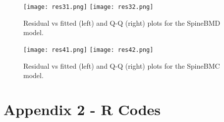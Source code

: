 \documentclass[11pt]{article}
\begin{document}
            \begin{figure}[!htbp]
            \centering
            \texttt{[image: res31.png]} \texttt{[image: res32.png]}
            \caption{Residual vs fitted (left) and Q-Q (right) plots for the SpineBMD model.}
            \label{fig:method}
            \end{figure}

            \begin{figure}[!htbp]
            \centering
            \texttt{[image: res41.png]} \texttt{[image: res42.png]}
            \caption{Residual vs fitted (left) and Q-Q (right) plots for the SpineBMC model.}
            \label{fig:method}
            \end{figure}

\newpage 

\section*{Appendix 2 - R Codes}
\ifprintCode
\end{document}
